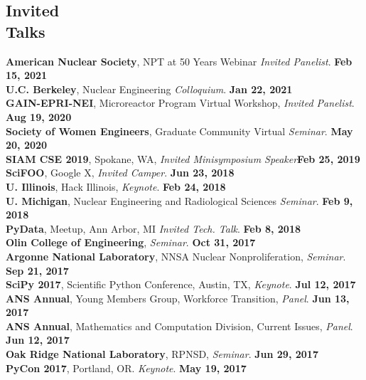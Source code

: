 \documentclass[margin,line]{resume}
\begin{document}
\begin{resume}
    \section{\mysidestyle Invited\\Talks}
    \textbf{American Nuclear Society}, NPT at 50 Years Webinar \emph{Invited Panelist}.  \hfill\textbf{Feb 15, 2021}\\
    \textbf{U.C. Berkeley}, Nuclear Engineering \emph{Colloquium}.  \hfill\textbf{Jan 22, 2021}\\
    \textbf{GAIN-EPRI-NEI}, Microreactor Program Virtual Workshop, \emph{Invited Panelist}.  \hfill\textbf{Aug 19, 2020}\\
    \textbf{Society of Women Engineers}, Graduate Community Virtual \emph{Seminar}.  \hfill\textbf{May 20, 2020}\\
    \textbf{SIAM CSE 2019}, Spokane, WA, \emph{Invited Minisymposium Speaker}\hfill\textbf{Feb 25, 2019}\\
      \textbf{SciFOO}, Google X, \emph{Invited Camper}.  \hfill\textbf{Jun 23, 2018}\\
      \textbf{U. Illinois}, Hack Illinois, \emph{Keynote}.  \hfill\textbf{Feb 24, 2018}\\
      \textbf{U. Michigan}, Nuclear Engineering and Radiological Sciences \emph{Seminar}.  \hfill\textbf{Feb 9, 2018}\\
      \textbf{PyData}, Meetup, Ann Arbor, MI \emph{Invited Tech. Talk}.  \hfill\textbf{Feb 8, 2018}\\
      \textbf{Olin College of Engineering}, \emph{Seminar}.  \hfill\textbf{Oct 31, 2017}\\
      \textbf{Argonne National Laboratory}, NNSA Nuclear Nonproliferation, \emph{Seminar}.  \hfill\textbf{Sep 21, 2017}\\
      \textbf{SciPy 2017}, Scientific Python Conference, Austin, TX, \emph{Keynote}.  \hfill\textbf{Jul 12, 2017}\\
      \textbf{ANS Annual}, Young Members Group, Workforce Transition, \emph{Panel}.  \hfill\textbf{Jun 13, 2017}\\
      \textbf{ANS Annual}, Mathematics and Computation Division, Current Issues, \emph{Panel}.  \hfill\textbf{Jun 12, 2017}\\
      \textbf{Oak Ridge National Laboratory}, RPNSD, \emph{Seminar}.  \hfill\textbf{Jun 29, 2017}\\
      \textbf{PyCon 2017}, Portland, OR. \emph{Keynote}.  \hfill\textbf{May 19, 2017}\\

\end{resume}
\end{document}
